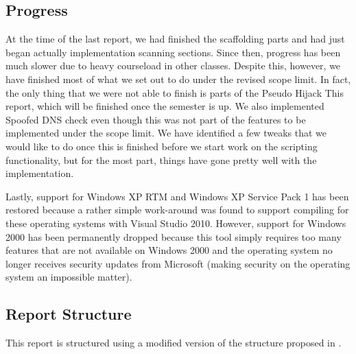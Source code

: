 \documentclass[letterpaper,12pt]{article}
\begin{document}
\subsection{Progress}
At the time of the last report, we had finished the scaffolding parts and had
just began actually implementation scanning sections.  Since then, progress has
been much slower due to heavy courseload in other classes.  Despite this,
however, we have finished most of what we set out to do under the revised scope
limit.  In fact, the only thing that we were not able to finish is parts of the
Pseudo Hijack This report, which will be finished once the semester is up.  We
also implemented Spoofed DNS check even though this was not part of the features
to be implemented under the scope limit. We have identified a few tweaks that we
would like to do once this is finished before we start work on the scripting
functionality, but for the most part, things have gone pretty well with the
implementation.

Lastly, support for Windows XP RTM and Windows XP Service Pack 1 has been
restored because a rather simple work-around was found to support compiling for
these operating systems with Visual Studio 2010.  However, support for Windows
2000 has been permanently dropped because this tool simply requires too many
features that are not available on Windows 2000 and the operating system no
longer receives security updates from Microsoft (making security on the
operating system an impossible matter).

\subsection{Report Structure}
This report is structured using a modified version of the structure proposed in
\cite{ReportGuidelines}.
\end{document}
